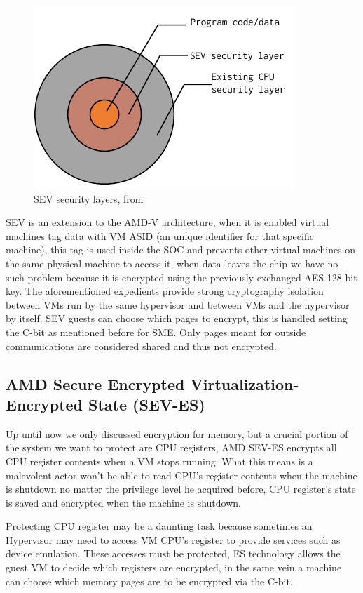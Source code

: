 \documentclass[twocolumn]{article}
\begin{document}
\begin{figure}
    \centering
    \includegraphics[scale=0.9]{img/security-layers.pdf}
    \caption{SEV security layers, from \cite{memory-encryption}}
\end{figure}

SEV is an extension to the AMD-V architecture, when it is enabled virtual machines tag data with VM ASID (an unique identifier for that specific machine), this tag is used inside the SOC and prevents other virtual machines on the same physical machine to access it, when data leaves the chip we have no such problem because it is encrypted using the previously exchanged AES-128 bit key. The aforementioned expedients provide strong cryptography isolation between VMs run by the same hypervisor and between VMs and the hypervisor by itself. SEV guests can choose which pages to encrypt, this is handled setting the C-bit as mentioned before for SME. Only pages meant for outside communications are considered shared and thus not encrypted.

\subsection{AMD Secure Encrypted Virtualization-Encrypted State (SEV-ES)}

Up until now we only discussed encryption for memory, but a crucial portion of the system we want to protect are CPU registers, AMD SEV-ES encrypts all CPU register contents when a VM stops running. What this means is a malevolent actor won't be able to read CPU's register contents when the machine is shutdown no matter the privilege level he acquired before, CPU register's state is saved and encrypted when the machine is shutdown.

Protecting CPU register may be a daunting task because sometimes an Hypervisor may need to access VM CPU's register to provide services such as device emulation. These accesses must be protected, ES technology allows the guest VM to decide which registers are encrypted, in the same vein a machine can choose which memory pages are to be encrypted via the C-bit.
\end{document}
